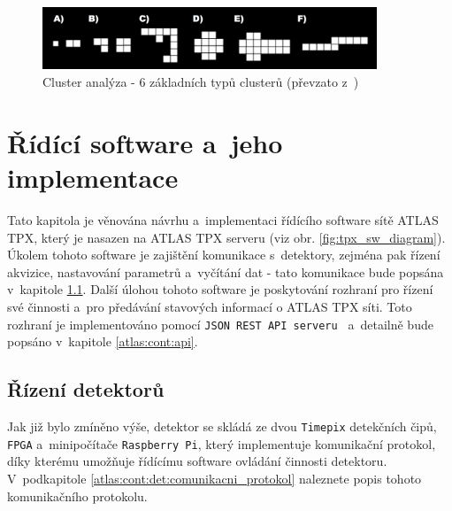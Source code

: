 \begin{figure}[t]
	\begin{center}
		\includegraphics[width=10cm]{figures/ca.png}
		\caption{Cluster analýza - 6 základních typů clusterů (převzato z~\cite{TurecekThesis2011})}
		\label{fig:tpx_ca}
	\end{center}
\end{figure}


\section{Řídící software a~jeho implementace}\label{atlas:cont}
Tato kapitola je věnována návrhu a~implementaci řídícího software sítě ATLAS TPX, který je nasazen na ATLAS TPX serveru (viz obr. \ref{fig:tpx_sw_diagram}). Úkolem  tohoto software je zajištění komunikace s~detektory, zejména pak řízení akvizice, nastavování parametrů a~vyčítání dat - tato komunikace bude popsána v~kapitole \ref{atlas:cont:det}. Další úlohou tohoto software je poskytování rozhraní pro řízení své činnosti a~pro předávání stavových informací o ATLAS TPX síti. Toto rozhraní je implementováno pomocí \texttt{JSON REST API serveru } a~detailně bude popsáno v~kapitole \ref{atlas:cont:api}.

\subsection{Řízení detektorů}\label{atlas:cont:det} %
Jak již bylo zmíněno výše, detektor se skládá ze dvou \texttt{Timepix} detekčních čipů, \texttt{FPGA} a~minipočítače \texttt{Raspberry Pi}, který implementuje komunikační protokol, díky kterému umožňuje řídícímu software ovládání činnosti detektoru. V~podkapitole \ref{atlas:cont:det:comunikacni_protokol} naleznete popis tohoto komunikačního protokolu.

